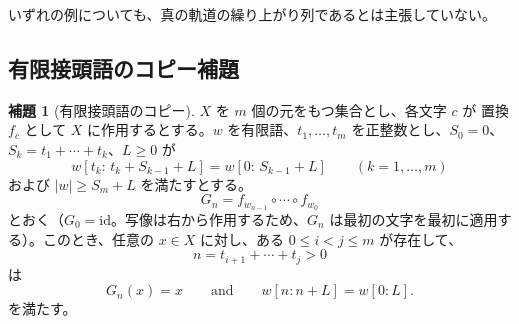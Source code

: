 \documentclass[11pt,reqno]{amsart}
\theoremstyle{definition}
\newtheorem{lemma}[theorem]{補題}
\theoremstyle{definition}
\theoremstyle{remark}
\begin{document}
いずれの例についても、真の軌道の繰り上がり列であるとは主張していない。

\subsection{有限接頭語のコピー補題}\label{sec:B.2}

\begin{samepage}
\begin{lemma}[有限接頭語のコピー]\leavevmode\label{thm:49}
\(X\) を \(m\) 個の元をもつ集合とし、各文字 \(c\) が 置換 \(f_c\) として \(X\) に作用するとする。\(w\) を有限語、\(t_1,\ldots,t_m\) を正整数とし、\(S_0=0\)、\(S_k=t_1+\cdots+t_k\)、\(L\ge0\) が
\[
w[t_k:\,t_k+S_{k-1}+L]=w[0:\,S_{k-1}+L]\qquad(k=1,\ldots,m)
\tag{31}\label{eq:31}
\]
および \(|w|\ge S_m+L\) を満たすとする。
\[
G_n=f_{w_{n-1}}\circ\cdots\circ f_{w_0}
\]
とおく（\(G_0=\mathrm{id}\)。写像は右から作用するため、\(G_n\) は最初の文字を最初に適用する）。このとき、任意の \(x\in X\) に対し、ある
\(0\le i<j\le m\) が存在して、
\[
n=t_{i+1}+\cdots+t_j>0
\]
は
\[
G_n(x)=x\qquad \text{and}\qquad w[n:n+L]=w[0:L].
\]
を満たす。
\label{thm-end:49}
\end{lemma}
\end{samepage}
\end{document}
